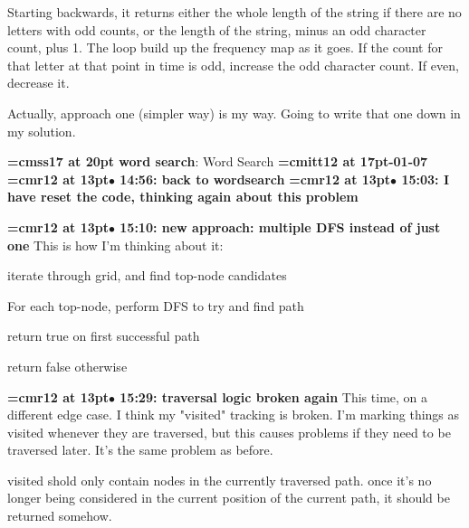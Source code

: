 Starting backwards, it returns either the whole length of the string if there are no letters with odd counts, or the length of the string, minus an odd character count, plus 1. The loop build up the frequency map as it goes. If the count for that letter at that point in time is odd, increase the odd character count. If even, decrease it.
\par

Actually, approach one (simpler way) is my way. Going to write that one down in my solution.
\par

{\medskip\noindent\bf\font\titlefont=cmss17 at 20pt word search}: Word Search
{\medskip\noindent\bf\font\titlefont=cmitt12 at 17pt-01-07}\medskip
{\smallskip\noindent\bf\font\titlefont=cmr12 at 13pt\titlefont $\bullet$ 14:56: back to wordsearch}\smallskip
{\smallskip\noindent\bf\font\titlefont=cmr12 at 13pt\titlefont $\bullet$ 15:03: I have reset the code, thinking again about this problem}\smallskip
 
\par

{\smallskip\noindent\bf\font\titlefont=cmr12 at 13pt\titlefont $\bullet$ 15:10: new approach: multiple DFS instead of just one}\smallskip
This is how I'm thinking about it:
\par

iterate through grid, and find top-node candidates
\par

For each top-node, perform DFS to try and find path
\par

return true on first successful path
\par

return false otherwise
\par

{\smallskip\noindent\bf\font\titlefont=cmr12 at 13pt\titlefont $\bullet$ 15:29: traversal logic broken again}\smallskip
This time, on a different edge case. I think my "visited" tracking is broken. I'm marking things as visited whenever they are traversed, but this causes problems if they need to be traversed later. It's the same problem as before.
\par

visited shold only contain nodes in the currently traversed path. once it's no longer being considered in the current position of the current path, it should be returned somehow.
\par

